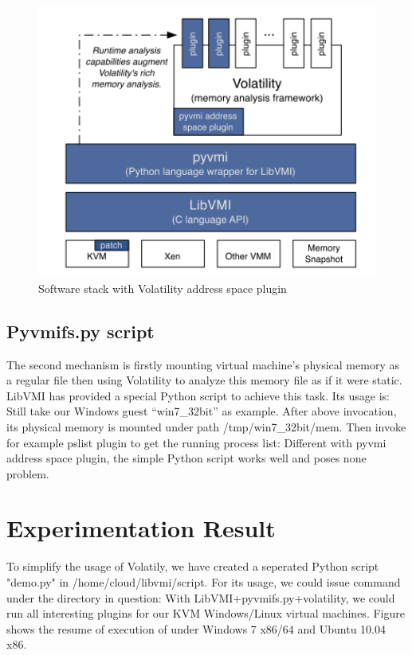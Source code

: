 \begin{figure}[htbp]
	\centering
		\includegraphics[width=14cm, height= 9cm ]{Figures/Figure30.png}
	\caption[Software stack with Volatility address space plugin]{Software stack with Volatility address space plugin \cite{Reference6}}
	\label{fig:Software stack with Volatility address space plugin}
\end{figure}

\subsection{Pyvmifs.py script}
The second mechanism is firstly mounting virtual machine’s physical memory as a regular file then using Volatility to analyze this 
memory file as if it were static. LibVMI has provided a special Python script to achieve this task. Its usage is:
Still take our Windows guest “win7\_32bit” as example. After above invocation, its physical memory is mounted under path 
/tmp/win7\_32bit/mem. Then invoke for example pslist plugin to get the running process list:
Different with pyvmi address space plugin, the simple Python script works well and poses none problem.

\section{Experimentation Result}
To simplify the usage of Volatily, we have created a seperated Python script "demo.py" in /home/cloud/libvmi/script. For its usage,
we could issue command under the directory in question:
With LibVMI+pyvmifs.py+volatility, we could run all interesting plugins for our KVM Windows/Linux virtual machines. 
Figure shows the resume of execution of under Windows 7 x86/64 and Ubuntu 10.04 x86.


